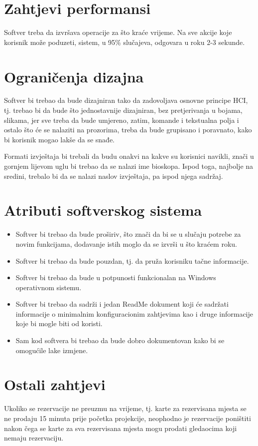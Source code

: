 \section{Zahtjevi performansi}
Softver treba da izvršava operacije za što kraće vrijeme. Na sve akcije koje korisnik može poduzeti, sistem, u 95\% slučajeva, 
odgovara u roku 2-3 sekunde.

\section{Ograničenja dizajna}
Softver bi trebao da bude dizajniran tako da zadovoljava osnovne principe HCI,
tj. trebao bi da bude što jednostavnije dizajniran, bez pretjerivanja u bojama,
slikama, jer sve treba da bude umjereno, zatim, komande i tekstualna polja i
ostalo što će se nalaziti na prozorima, treba da bude grupisano i poravnato, kako
bi korisnik mogao lakše da se snađe.

Formati izvještaja bi trebali da budu onakvi na kakve su korisnici navikli, znači u
gornjem lijevom uglu bi trebao da se nalazi ime bioskopa. Ispod toga, najbolje na sredini, trebalo bi da se nalazi
naslov izvještaja, pa ispod njega sadržaj.

\section{Atributi softverskog sistema}
\begin{itemize}
\item Softver bi trebao da bude proširiv, što znači da bi se u slučaju potrebe za novim funkcijama, dodavanje 
istih moglo da se izvrši u što kraćem roku.
\item Softver bi trebao da bude pouzdan, tj. da pruža korisniku tačne informacije.
\item Softver bi trebao da bude u potpunosti funkcionalan na Windows operativnom sistemu.
\item Softver bi trebao da sadrži i jedan ReadMe dokument koji će sadržati informacije o minimalnim konfiguracionim 
zahtjevima kao i druge informacije koje bi mogle biti od koristi.
\item Sam kod softvera bi trebao da bude dobro dokumentovan kako bi se omogućile lake izmjene.
\end{itemize}

\section{Ostali zahtjevi}
Ukoliko se rezervacije ne preuzmu na vrijeme, tj. karte za rezervisana mjesta se ne prodaju 15 minuta prije početka projekcije, neophodno je rezervacije poništiti nakon čega se karte za sva rezervisana mjesta mogu prodati gledaocima koji nemaju rezervaciju.